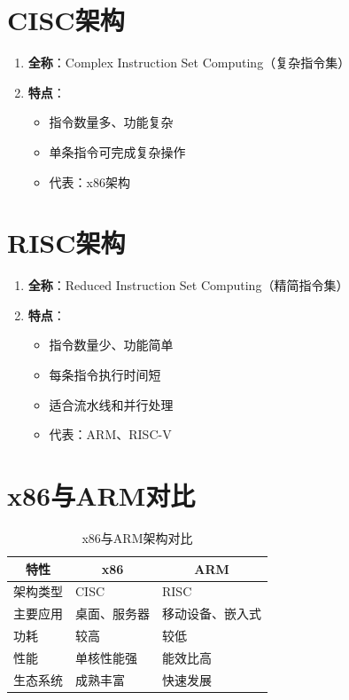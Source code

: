 \documentclass[12pt,UTF8]{ctexbook}
\begin{document}
\section{CISC架构}

\begin{enumerate}
    \item \textbf{全称}：Complex Instruction Set Computing（复杂指令集）
    \item \textbf{特点}：
    \begin{itemize}[leftmargin=2em]
        \item 指令数量多、功能复杂
        \item 单条指令可完成复杂操作
        \item 代表：x86架构
    \end{itemize}
\end{enumerate}

\section{RISC架构}

\begin{enumerate}
    \item \textbf{全称}：Reduced Instruction Set Computing（精简指令集）
    \item \textbf{特点}：
    \begin{itemize}[leftmargin=2em]
        \item 指令数量少、功能简单
        \item 每条指令执行时间短
        \item 适合流水线和并行处理
        \item 代表：ARM、RISC-V
    \end{itemize}
\end{enumerate}

\section{x86与ARM对比}

\begin{table}[H]
    \centering
    \begin{tabularx}{\textwidth}{|p{3cm}|X|X|}
        \hline
        \multicolumn{1}{|c|}{\textbf{特性}} & \multicolumn{1}{c|}{\textbf{x86}} & \multicolumn{1}{c|}{\textbf{ARM}} \\
        \hline
        架构类型 & CISC & RISC \\
        \hline
        主要应用 & 桌面、服务器 & 移动设备、嵌入式 \\
        \hline
        功耗 & 较高 & 较低 \\
        \hline
        性能 & 单核性能强 & 能效比高 \\
        \hline
        生态系统 & 成熟丰富 & 快速发展 \\
        \hline
    \end{tabularx}
    \caption{x86与ARM架构对比}
    \label{tab:x86_vs_arm}
\end{table}
\end{document}
